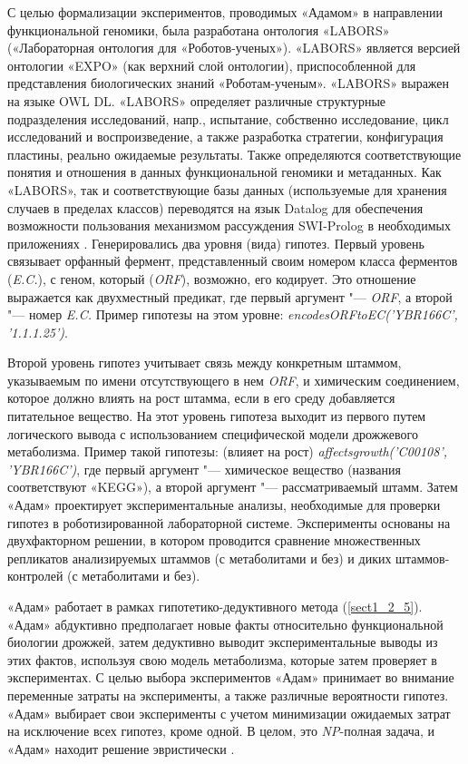 С целью формализации экспериментов, проводимых «Адамом» в направлении функциональной геномики, была разработана 
онтология «LABORS» («Лабораторная онтология для «Роботов-ученых»). «LABORS» является версией онтологии «EXPO» (как 
верхний слой онтологии), приспособленной для представления биологических знаний «Роботам-ученым». «LABORS» выражен 
на языке OWL DL. «LABORS» определяет различные структурные подразделения исследований, напр., испытание, собственно 
исследование, цикл исследований и воспроизведение, а также разработка стратегии, конфигурация пластины, реально 
ожидаемые результаты. Также определяются соответствующие понятия и отношения в данных функциональной геномики и 
метаданных. Как «LABORS», так и соответствующие базы данных (используемые для хранения случаев в пределах классов) 
переводятся на язык Datalog для обеспечения возможности пользования механизмом рассуждения SWI-Prolog в необходимых 
приложениях \cite{king2004functional}
.
Генерировались два уровня (вида) гипотез. Первый уровень связывает орфанный фермент, представленный своим номером 
класса ферментов (\textit{E.C.}), с геном, который (\textit{ORF}), возможно, его кодирует. Это отношение выражается 
как двухместный предикат, где первый аргумент "--- \textit{ORF}, а второй "--- номер \textit{E.C.} Пример гипотезы 
на этом уровне: \textit{encodesORFtoEC('YBR166C', '1.1.1.25')}.

Второй уровень гипотез учитывает связь между конкретным штаммом, указываемым по имени отсутствующего в нем \textit{ORF}, 
и химическим соединением, которое должно влиять на рост штамма, если в его среду добавляется питательное вещество. На 
этот уровень гипотеза выходит из первого путем логического вывода с использованием специфической модели дрожжевого 
метаболизма. Пример такой гипотезы: (влияет на рост) \textit{affects\textunderscore growth('C00108', 'YBR166C')}, где 
первый аргумент "--- химическое вещество (названия соответствуют «KEGG»), а второй аргумент "--- рассматриваемый штамм. 
Затем «Адам» проектирует экспериментальные анализы, необходимые для проверки гипотез в роботизированной лабораторной 
системе. Эксперименты основаны на двухфакторном решении, в котором проводится сравнение множественных репликатов 
анализируемых штаммов (с метаболитами и без) и диких штаммов-контролей (с метаболитами и без).

«Адам» работает в рамках гипотетико-дедуктивного метода (\cref{sect1_2_5}). «Адам» абдуктивно предполагает новые факты 
относительно функциональной биологии дрожжей, затем дедуктивно выводит экспериментальные выводы из этих фактов, 
используя свою модель метаболизма, которые затем проверяет в экспериментах. С целью выбора экспериментов «Адам» 
принимает во внимание переменные затраты на эксперименты, а также различные вероятности гипотез. «Адам» выбирает 
свои эксперименты с учетом минимизации ожидаемых затрат на исключение всех гипотез, кроме одной. В целом, это 
\textit{NP}-полная задача, и «Адам» находит решение эвристически \cite{soldatova2011representation}.

